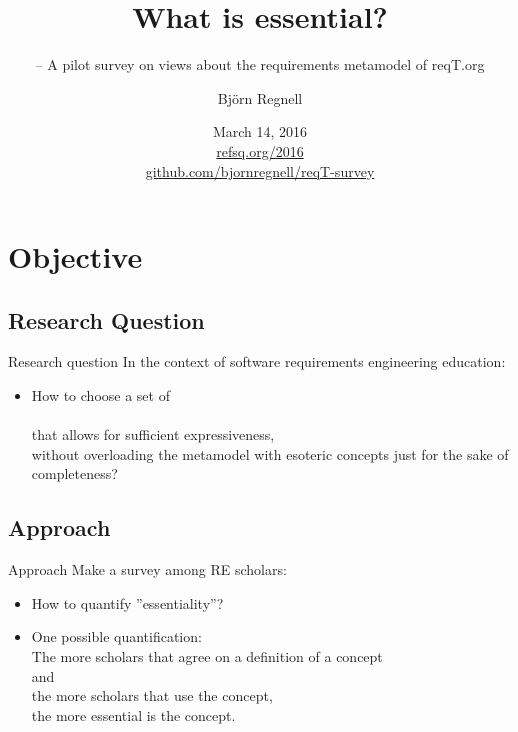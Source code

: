 \documentclass{slides}
\title[What is essential?]{What is essential?}
\subtitle{\footnotesize -- A pilot survey on views about the requirements metamodel of reqT.org}
\author{Björn Regnell}
\institute{Lund University}
\date{March 14, 2016\\ \href{http://refsq.org/2016}{refsq.org/2016}\\ \href{https://github.com/bjornregnell/reqT-survey}{github.com/bjornregnell/reqT-survey}}
\begin{document}
\frame{\titlepage}
\frame{\tableofcontents}

\section{Objective}
\subsection{Research Question}
\begin{Slide}{Research question}
In the context of software requirements engineering education:
\begin{itemize}
\item How to choose a set of \\  \\ that allows for sufficient expressiveness, \\ without overloading the metamodel with esoteric concepts just for the sake of completeness?
\end{itemize}
\end{Slide}
\subsection{Approach}
\begin{Slide}{Approach}
Make a survey among RE scholars:
\begin{itemize}
\item How to quantify ''essentiality''?
\pause
\item One possible quantification: \\ The more scholars that agree on a definition of a concept \\ and \\ the more scholars that use the concept, \\ the more essential is the concept.
\end{itemize}
\end{Slide}
\end{document}

